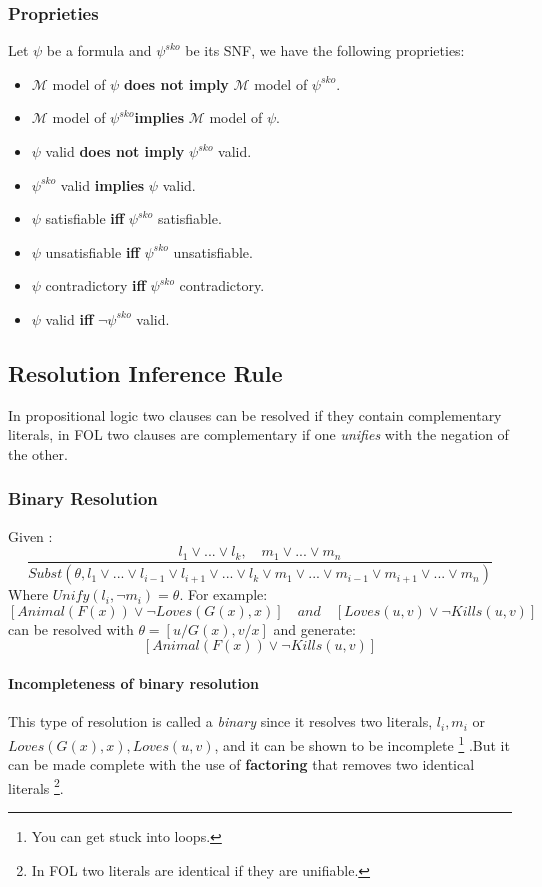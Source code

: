 \documentclass[10pt,a4paper]{article}
\newcommand{\subst}[1]{Subst(\theta,#1)}
\begin{document}
\subsubsection{Proprieties}
Let $\psi$ be a formula and $\psi^{sko}$ be its SNF, we have the following proprieties:
\begin{itemize}
\item $\mathcal{M}$ model of $\psi$ \textbf{does not imply}  $\mathcal{M}$ model of $\psi^{sko}$.
\item $\mathcal{M}$ model of $\psi^{sko}$\textbf{implies}  $\mathcal{M}$ model of $\psi$.

\item $\psi$ valid \textbf{does not imply}  $\psi^{sko}$ valid.
\item $\psi^{sko}$ valid \textbf{implies}  $\psi$ valid.

\item $\psi$ satisfiable \textbf{iff}  $\psi^{sko}$ satisfiable.
\item $\psi$ unsatisfiable \textbf{iff}  $\psi^{sko}$ unsatisfiable.
\item $\psi$ contradictory \textbf{iff}  $\psi^{sko}$ contradictory.
\item $\psi$ valid \textbf{iff}  $\neg \psi^{sko}$ valid.

\end{itemize}



\subsection{Resolution Inference Rule}
In propositional logic two clauses can be resolved if they contain complementary literals, in FOL two clauses are complementary if one \textit{unifies} with the negation of the other.

\subsubsection{Binary Resolution}
\label{sec:binaryresolution}
Given :
\[\frac{l_1\vee...\vee l_k,\quad m_1\vee...\vee m_n}{\subst{l_1 \vee ... \vee l_{i-1}\vee l_{i+1}\vee ... \vee l_k\vee m_1 \vee ... \vee m_{i-1}\vee m_{i+1}\vee ... \vee m_n}}\]
Where $Unify(l_i,\neg m_i)=\theta$. For example:
\[[Animal(F(x))\vee \neg Loves(G(x),x)]\quad and \quad [Loves(u,v)\vee \neg Kills(u,v)]\]
can be resolved with $\theta=[u/G(x),v/x]$ and generate:
\[[Animal(F(x))\vee \neg Kills(u,v)]\]

\paragraph{Incompleteness of binary resolution}
This type of resolution is called a \textit{binary} since it resolves two literals, $l_i,m_i$ or $Loves(G(x),x),Loves(u,v)$, and it can be shown to be incomplete \footnote{You can get stuck into loops.} .But it can be made complete with the use of \textbf{factoring} that removes two identical literals \footnote{In FOL two literals are identical if they are unifiable. }.
\end{document}

